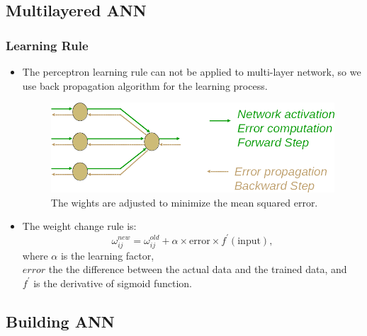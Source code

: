 \documentclass{beamer}
\begin{document}
\subsection{Multilayered ANN}

\begin{frame}[allowframebreaks]
    \frametitle{Learning Rule}

    \begin{itemize}
        \item The perceptron learning rule can not be applied to multi-layer network, so we use back propagation algorithm for the learning process.
    

    \begin{figure}[]
        \centering
        \includegraphics[width=\textwidth,height=\textheight,keepaspectratio]{assets/images/ann-bp.png}
        \caption{The wights are adjusted to minimize the mean squared error.}
    \end{figure}

    \item The weight change rule is:
    \begin{equation}
        \omega_{ij}^{new} = \omega_{ij}^{old}+\alpha\times \text{error}\times f^{'} (\text{input}),
    \end{equation}
where $\alpha$ is the learning factor, \\ $error$ the the difference between the actual data and the trained data, and \\
$f^{'}$ is the derivative of sigmoid function.

\end{itemize}

\end{frame}


\subsection{Building ANN}
\end{document}

